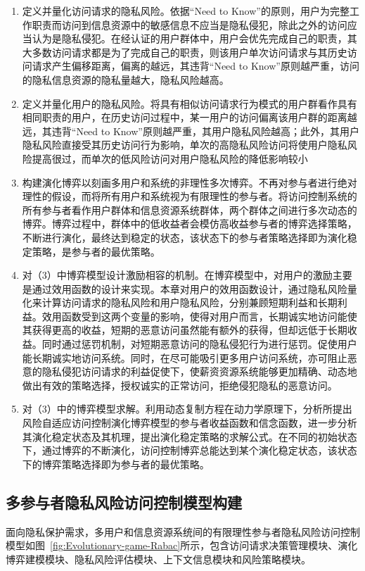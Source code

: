 \begin{enumerate}
	\item 定义并量化访问请求的隐私风险。依据“Need to Know”的原则，用户为完整工作职责而访问到信息资源中的敏感信息不应当是隐私侵犯，除此之外的访问应当认为是隐私侵犯。在经认证的用户群体中，用户会优先完成自己的职责，其大多数访问请求都是为了完成自己的职责，则该用户单次访问请求与其历史访问请求产生偏移距离，偏离的越远，其违背“Need to Know”原则越严重，访问的隐私信息资源的隐私量越大，隐私风险越高。
	\item 定义并量化用户的隐私风险。将具有相似访问请求行为模式的用户群看作具有相同职责的用户，在历史访问过程中，某一用户的访问偏离该用户群的距离越远，其违背“Need to Know”原则越严重，其用户隐私风险越高；此外，其用户隐私风险直接受其历史访问行为影响，单次的高隐私风险访问将使用户隐私风险提高很过，而单次的低风险访问对用户隐私风险的降低影响较小
	\item 构建演化博弈以刻画多用户和系统的非理性多次博弈。不再对参与者进行绝对理性的假设，而将所有用户和系统视为有限理性的参与者。将访问控制系统的所有参与者看作用户群体和信息资源系统群体，两个群体之间进行多次动态的博弈。博弈过程中，群体中的低收益者会模仿高收益参与者的博弈选择策略，不断进行演化，最终达到稳定的状态，该状态下的参与者策略选择即为演化稳定策略，是参与者的最优策略。
	\item 对（3）中博弈模型设计激励相容的机制。在博弈模型中，对用户的激励主要是通过效用函数的设计来实现。本章对用户的效用函数设计，通过隐私风险量化来计算访问请求的隐私风险和用户隐私风险，分别兼顾短期利益和长期利益。效用函数受到这两个变量的影响，使得对用户而言，长期诚实地访问能使其获得更高的收益，短期的恶意访问虽然能有额外的获得，但却远低于长期收益。同时通过惩罚机制，对短期恶意访问的隐私侵犯行为进行惩罚。促使用户能长期诚实地访问系统。同时，在尽可能吸引更多用户访问系统，亦可阻止恶意的隐私侵犯访问请求的利益促使下，使薪资资源系统能够更加精确、动态地做出有效的策略选择，授权诚实的正常访问，拒绝侵犯隐私的恶意访问。
	\item 对（3）中的博弈模型求解。利用动态复制方程在动力学原理下，分析所提出风险自适应访问控制演化博弈模型的参与者收益函数和信念函数，进一步分析其演化稳定状态及其机理，提出演化稳定策略的求解公式。在不同的初始状态下，通过博弈的不断演化，访问控制博弈总能达到某个演化稳定状态，该状态下的博弈策略选择即为参与者的最优策略。
\end{enumerate}

\subsection{多参与者隐私风险访问控制模型构建}
面向隐私保护需求，多用户和信息资源系统间的有限理性参与者隐私风险访问控制模型如图~\ref{fig:Evolutionary-game-Rabac}所示，包含访问请求决策管理模块、演化博弈建模模块、隐私风险评估模块、上下文信息模块和风险策略模块。

